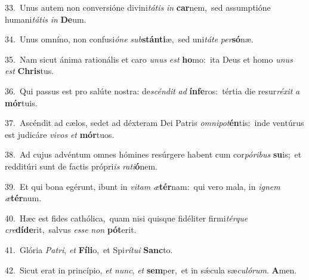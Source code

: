 {\numbfont\textcolor{\numbcolor}{33.}}~Unus autem non conversióne divini\-\textit{tá}\-\textit{tis} \textit{in} \textbf{car}\-nem,~\star sed assumptióne humani\-\textit{tá}\-\textit{tis} \textit{in} \textbf{De}\-um.\par
{\numbfont\textcolor{\numbcolor}{34.}}~Unus omníno, non confusi\-\textit{ó}\-\textit{ne} \textit{sub}\-\textbf{stán}\textbf{ti}æ,~\star sed uni\-\textit{tá}\-\textit{te} \textit{per}\-\textbf{só}næ.\par
{\numbfont\textcolor{\numbcolor}{35.}}~Nam sicut ánima rationális et caro \textit{u}\-\textit{nus} \textit{est} \textbf{ho}\-mo:~\star ita Deus et homo \textit{u}\-\textit{nus} \textit{est} \textbf{Chris}\-tus.\par
{\numbfont\textcolor{\numbcolor}{36.}}~Qui passus est pro salúte nostra: de\-\textit{scén}\-\textit{dit} \textit{ad} \textbf{ín}\-\textbf{fe}ros:~\star tértia die resur\-\textit{ré}\-\textit{xit} \textit{a} \textbf{mór}\-tuis.\par
{\numbfont\textcolor{\numbcolor}{37.}}~Ascéndit ad cælos, sedet ad déxteram Dei Patris \textit{om}\-\textit{ni}\textit{pot}\textbf{én}tis:~\star inde ventúrus est judicáre \textit{vi}\-\textit{vos} \textit{et} \textbf{mór}\-tuos.\par
{\numbfont\textcolor{\numbcolor}{38.}}~Ad cujus advéntum omnes hómines resúrgere habent cum cor\-\textit{pó}\-\textit{ri}\textit{bus} \textbf{su}\-is;~\star et redditúri sunt de factis própri\textit{is} \textit{ra}\-\textit{ti}\textbf{ó}nem.\par
{\numbfont\textcolor{\numbcolor}{39.}}~Et qui bona egérunt, ibunt in \textit{vi}\-\textit{tam} \textit{æ}\-\textbf{tér}nam:~\star qui vero mala, in \textit{i}\-\textit{gnem} \textit{æ}\-\textbf{tér}num.\par
{\numbfont\textcolor{\numbcolor}{40.}}~Hæc est fides cathólica,~\dagger quam nisi quisque fidéliter firmi\-\textit{tér}\-\textit{que} \textit{cre}\-\textbf{dí}\textbf{de}rit,~\star salvus \textit{es}\-\textit{se} \textit{non} \textbf{pót}\-erit.\par
{\numbfont\textcolor{\numbcolor}{41.}}~Glória \textit{Pa}\-\textit{tri}, \textit{et} \textbf{Fí}\-\textbf{li}o,~\star et Spi\-\textit{rí}\-\textit{tu}\textit{i} \textbf{Sanc}\-to.\par
{\numbfont\textcolor{\numbcolor}{42.}}~Sicut erat in princípio, \textit{et} \textit{nunc}\-, \textit{et} \textbf{sem}\-per,~\star et in sǽcula sæ\-\textit{cu}\-\textit{ló}\textit{rum}. \textbf{A}\-men.\par
